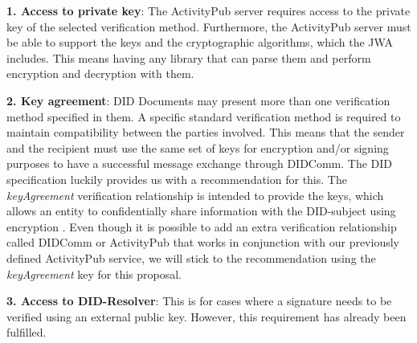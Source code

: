\textbf{1. Access to private key}: The ActivityPub server requires access to the private key of the selected verification method. Furthermore, the ActivityPub server must be able to support the keys and the cryptographic algorithms, which the JWA includes. This means having any library that can parse them and perform encryption and decryption with them.

\textbf{2. Key agreement}: DID Documents may present more than one verification method specified in them. A specific standard verification method is required to maintain compatibility between the parties involved. This means that the sender and the recipient must use the same set of keys for encryption and/or signing purposes to have a successful message exchange through DIDComm. The DID specification luckily provides us with a recommendation for this. The \emph{keyAgreement} verification relationship is intended to provide the keys, which allows an entity to confidentially share information with the DID-subject using encryption \cite{sporny_longley_sabadello_reed_steele_2021}. Even though it is possible to add an extra verification relationship called DIDComm or ActivityPub that works in conjunction with our previously defined ActivityPub service, we will stick to the recommendation using the \emph{keyAgreement} key for this proposal.

\textbf{3. Access to DID-Resolver}: This is for cases where a signature needs to be verified using an external public key. However, this requirement has already been fulfilled. 

